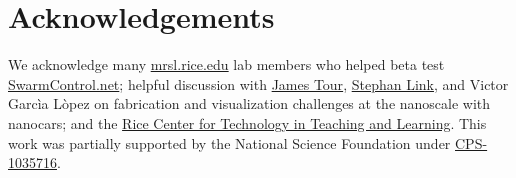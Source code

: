 \documentclass[letterpaper, 10 pt, conference]{ieeeconf}
\begin{document}






%












    
    
\section{Acknowledgements}
We acknowledge many \href{http://mrsl.rice.edu/}{mrsl.rice.edu} lab members who helped beta test \href{http://www.swarmcontrol.net}{SwarmControl.net}; helpful discussion with \href{http://www.jmtour.com/}{James Tour}, \href{http://slink.rice.edu/}{Stephan Link}, and Victor Garc\`ia L\`opez on fabrication and visualization challenges at the nanoscale with nanocars; and the \href{http://cttl.rice.edu/}{Rice Center for Technology in Teaching and Learning}.
This work was partially supported by the National Science Foundation under 
\href{http://www.nsf.gov/awardsearch/showAward?AWD_ID=1035716}{CPS-1035716}.  
   

\end{document}
